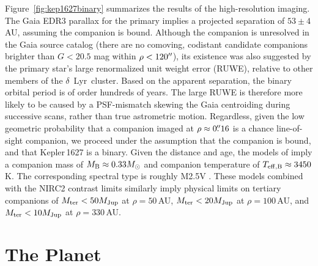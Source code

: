 \documentclass[12pt,modern,twocolumn,tighten]{aastex63}
\newcommand{\cn}{$\delta$\ Lyr\ cluster} %
\begin{document}
Figure~\ref{fig:kep1627binary} summarizes the results of the
high-resolution imaging.  The Gaia EDR3 parallax for the primary
implies a projected separation of $53 \pm 4$\,AU, assuming the
companion is bound.  Although the companion is unresolved in the Gaia
source catalog (there are no comoving, codistant candidate companions
brighter than $G < 20.5$ mag within $\rho < 120\mbox{$^{\prime\prime}$}$), its
existence was also suggested by the primary star's large renormalized unit weight error (RUWE),
relative to other members of the \cn.  Based on the apparent
separation, the binary orbital period is of order hundreds of years.
The large RUWE is therefore more likely to be caused by a PSF-mismatch
skewing the Gaia centroiding during successive scans, rather than true
astrometric motion.  Regardless, given the low geometric probability that a companion imaged at
$\rho \approx 0\mbox{$.\!\!^{\prime\prime}$}16$ is a chance line-of-sight companion, we
proceed under the assumption that the companion is bound, and that
Kepler\,1627 is a binary.  
Given the distance and age, the models of
\citet{baraffe_new_2015} imply a companion mass of $M_{\rm B} \approx
0.33 M_{\odot}$ and companion temperature of $T_{\rm eff,B} \approx
3450$ K.  The corresponding spectral type is roughly M2.5V
\citep{pecaut_mamajek_2013}.
These models combined with the NIRC2 contrast limits similarly imply
physical limits on tertiary companions of $M_{\rm ter} < 50
M_{\rm Jup}$ at $\rho = 50$\,AU, $M_{\rm ter} < 20 M_{\rm Jup}$ at $\rho =
100$\,AU, and $M_{\rm ter} < 10 M_{\rm Jup}$ at $\rho = 330$\,AU.



\section{The Planet}
\label{sec:planet}
\end{document}
